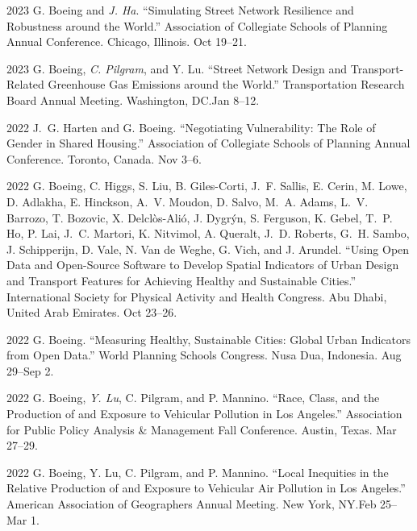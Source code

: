 \documentclass[11pt,letterpaper]{report}
\begin{document}
\begin{tablist}
        \item[2023] \tab{}G. Boeing and \textit{J. Ha}. \enquote{Simulating Street Network Resilience and Robustness around the World.} Association of Collegiate Schools of Planning Annual Conference. Chicago, Illinois. Oct 19--21.

        \item[2023] \tab{}G. Boeing, \textit{C. Pilgram}, and Y. Lu. \enquote{Street Network Design and Transport-Related Greenhouse Gas Emissions around the World.} Transportation Research Board Annual Meeting. Washington, DC.\@ Jan 8--12.

        \item[2022] \tab{}J.~G. Harten and G. Boeing. \enquote{Negotiating Vulnerability: The Role of Gender in Shared Housing.} Association of Collegiate Schools of Planning Annual Conference. Toronto, Canada. Nov 3--6.

        \item[2022] \tab{}G. Boeing, C. Higgs, S. Liu, B. Giles-Corti, J.~F. Sallis, E. Cerin, M. Lowe, D. Adlakha, E. Hinckson, A.~V. Moudon, D. Salvo, M.~A. Adams, L.~V. Barrozo, T. Bozovic, X. Delclòs-Alió, J. Dygrýn, S. Ferguson, K. Gebel, T.~P. Ho, P. Lai, J.~C. Martori, K. Nitvimol, A. Queralt, J.~D. Roberts, G.~H. Sambo, J. Schipperijn, D. Vale, N. Van de Weghe, G. Vich, and J. Arundel. \enquote{Using Open Data and Open-Source Software to Develop Spatial Indicators of Urban Design and Transport Features for Achieving Healthy and Sustainable Cities.} International Society for Physical Activity and Health Congress. Abu Dhabi, United Arab Emirates. Oct 23--26.

        \item[2022] \tab{}G. Boeing. \enquote{Measuring Healthy, Sustainable Cities: Global Urban Indicators from Open Data.} World Planning Schools Congress. Nusa Dua, Indonesia. Aug 29--Sep 2.

        \item[2022] \tab{}G. Boeing, \textit{Y. Lu}, C. Pilgram, and P. Mannino. \enquote{Race, Class, and the Production of and Exposure to Vehicular Pollution in Los Angeles.} Association for Public Policy Analysis \& Management Fall Conference. Austin, Texas. Mar 27--29.

        \item[2022] \tab{}G. Boeing, Y. Lu, C. Pilgram, and P. Mannino. \enquote{Local Inequities in the Relative Production of and Exposure to Vehicular Air Pollution in Los Angeles.} American Association of Geographers Annual Meeting. New York, NY.\@ Feb 25--Mar 1.


\end{tablist}
\end{document}

